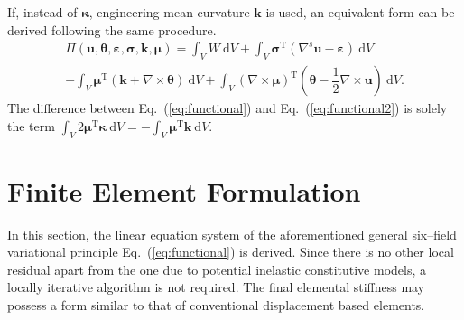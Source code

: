 \documentclass[3p,sort&compress,11pt,fleqn]{elsarticle}
\newcommand*{\eqsref}[1]{Eq.~(\ref{#1})}
\newcommand*{\mT}{\mathrm{T}}
\newcommand*{\md}[1]{\mathrm{d}#1}
\begin{document}
If, instead of $\mathbold{\kappa}$, engineering mean curvature $\mathbold{k}$ is used, an equivalent form can be derived following the same procedure.
\begin{multline}\label{eq:functional2}
\varPi\left(\mathbold{u},\mathbold{\theta},\mathbold{\varepsilon},\mathbold{\sigma},\mathbold{k},\mathbold{\mu}\right)=\int_VW~\md{V}
+\int_V\mathbold{\sigma}^\mT\left(\nabla^s\mathbold{u}-\mathbold{\varepsilon}\right)~\md{V}\\
-\int_V\mathbold{\mu}^\mT\left(\mathbold{k}+\nabla\times\mathbold{\theta}\right)~\md{V}
+\int_V\left(\nabla\times\mathbold{\mu}\right)^\mT\left(\mathbold{\theta}-\dfrac{1}{2}\nabla\times\mathbold{u}\right)~\md{V}.
\end{multline}
The difference between \eqsref{eq:functional} and \eqsref{eq:functional2} is solely the term $\displaystyle\int_V2\mathbold{\mu}^\mT\mathbold{\kappa}~\md{V}=-\int_V\mathbold{\mu}^\mT\mathbold{k}~\md{V}$.
\section{Finite Element Formulation}
In this section, the linear equation system of the aforementioned general six--field variational principle \eqsref{eq:functional} is derived. Since there is no other local residual apart from the one due to potential inelastic constitutive models, a locally iterative algorithm is not required. The final elemental stiffness may possess a form similar to that of conventional displacement based elements.
\end{document}
